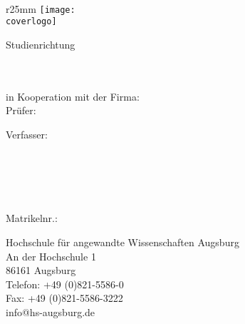 \thispagestyle{plain}
\begin{titlepage}
  \thispagestyle{empty}  
  \addtolength{\textwidth}{55mm}
  \addtolength{\oddsidemargin}{-18mm}
  
  ~
  \begin{wrapfigure}{r}{25mm}
    \vspace{-40mm}
    \texttt{[image: \\coverlogo]}
  \end{wrapfigure}
  
  
  \vspace{-1mm}
  
  \huge{\textcolor{HSAorange}{\selectfont\art}}
  
  
  \vspace{10mm}
  \Large{Studienrichtung \linebreak \studienbereich}
  \vspace{20mm}
  
  
  \begin{minipage}[t]{0.6\textwidth}
    \Large{\textbf{\titel}}\\[1.2ex]
    \large{\textbf{\untertitel}}\\
    \linebreak
    \large{in Kooperation mit der Firma: \fachgebiet}\\
    \linebreak
    \linebreak
    \large{Prüfer: \pruefer}\\
    
  \end{minipage}
  \hspace{0.1\textwidth}
  \hspace{5mm}
  \begin{minipage}[t]{40mm}
    \scriptsize
    Verfasser:\\
    \autor\\
    \addresse\\
    \plz\ \ort\\
    \telefon\\
    \mail\\
    Matrikelnr.: \matrikelnr\\
    
    \vspace{15mm}
    
    \textcolor{HSAred}{Hochschule für angewandte Wissenschaften Augsburg}\\
    \textcolor{HSAred}{An der Hochschule 1}\\
    \textcolor{HSAred}{86161 Augsburg}\\
    \textcolor{HSAred}{Telefon: +49 (0)821-5586-0}\\
    \textcolor{HSAred}{Fax: +49 (0)821-5586-3222}\\
    \textcolor{HSAred}{info@hs-augsburg.de}\\
    
  \end{minipage}
\end{titlepage}
